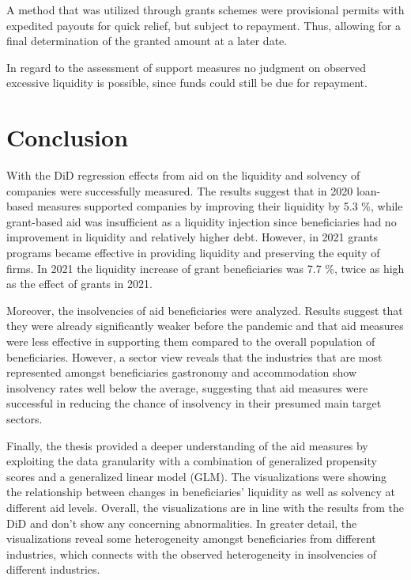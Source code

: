 A method that was utilized through grants schemes were provisional permits with expedited payouts for quick relief, but subject to repayment. Thus, allowing for a final determination of the granted amount at a later date. 

In regard to the assessment of support measures no judgment on observed excessive liquidity is possible, since funds could still be due for repayment.





\section{Conclusion}

With the DiD regression effects from aid on the liquidity and solvency of companies were successfully measured. The results suggest that in 2020 loan-based measures supported companies by improving their liquidity by 5.3 \%, while grant-based aid was insufficient as a liquidity injection since beneficiaries had no improvement in liquidity and relatively higher debt. However, in 2021 grants programs became effective in providing liquidity and preserving the equity of firms. In 2021 the liquidity increase of grant beneficiaries was 7.7 \%, twice as high as the effect of grants in 2021. 

Moreover, the insolvencies of aid beneficiaries were analyzed. Results suggest that they were already significantly weaker before the pandemic and that aid measures were less effective in supporting them compared to the overall population of beneficiaries. However, a sector view reveals that the industries that are most represented amongst beneficiaries gastronomy and accommodation show insolvency rates well below the average, suggesting that aid measures were successful in reducing the chance of insolvency in their presumed main target sectors.

Finally, the thesis provided a deeper understanding of the aid measures by exploiting the data granularity with a combination of generalized propensity scores and a generalized linear model (GLM). The visualizations were showing the relationship between changes in beneficiaries' liquidity as well as solvency at different aid levels. Overall, the visualizations are in line with the results from the DiD and don't show any concerning abnormalities. In greater detail, the visualizations reveal some heterogeneity amongst beneficiaries from different industries, which connects with the observed heterogeneity in insolvencies of different industries.

